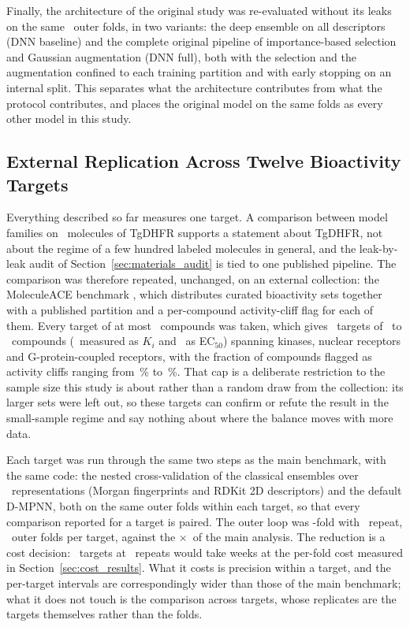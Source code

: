 Finally, the architecture of the original study was re-evaluated without its leaks on the same \TotalOuterFolds\ outer
folds, in two variants: the deep ensemble on all descriptors (DNN baseline) and the complete original pipeline of
importance-based selection and Gaussian augmentation (DNN full), both with the selection and the augmentation confined
to each training partition and with early stopping on an internal split. This separates what the architecture
contributes from what the protocol contributes, and places the original model on the same folds as every other model
in this study.


\subsection{External Replication Across Twelve Bioactivity Targets}
\label{sec:materials_generalization}

Everything described so far measures one target. A comparison between model families on \NCompounds\ molecules of
TgDHFR supports a statement about TgDHFR, not about the regime of a few hundred labeled molecules in general, and the
leak-by-leak audit of Section~\ref{sec:materials_audit} is tied to one published pipeline. The comparison was
therefore repeated, unchanged, on an external collection: the MoleculeACE benchmark \citep{vantilborg2022}, which
distributes curated bioactivity sets together with a published partition and a per-compound activity-cliff flag for
each of them. Every target of at most \GenMaxCompounds\ compounds was taken, which gives \GenNTargets\ targets of
\GenNMin\ to \GenNMax\ compounds (\GenNKi\ measured as $K_i$ and \GenNEC\ as EC$_{50}$) spanning kinases, nuclear
receptors and G-protein-coupled receptors, with the fraction of compounds flagged as activity cliffs ranging from
\GenCliffPctMin\,\% to \GenCliffPctMax\,\%. That cap is a deliberate restriction to the sample size this study is
about rather than a random draw from the collection: its larger sets were left out, so these targets can confirm or
refute the result in the small-sample regime and say nothing about where the balance moves with more data.

Each target was run through the same two steps as the main benchmark, with the same code: the nested cross-validation
of the classical ensembles over \GenNRepresentations\ representations (Morgan fingerprints and RDKit 2D descriptors)
and the default D-MPNN, both on the same outer folds within each target, so that every comparison reported for a
target is paired. The outer loop was \GenOuterKFolds-fold with \GenOuterRepeats\ repeat, \GenTotalOuterFolds\ outer
folds per target, against the \OuterRepeats$\times$\OuterKFolds\ of the main analysis. The reduction is a cost
decision: \GenNTargets\ targets at \OuterRepeats\ repeats would take weeks at the per-fold cost measured in
Section~\ref{sec:cost_results}. What it costs is precision within a target, and the per-target intervals are
correspondingly wider than those of the main benchmark; what it does not touch is the comparison across targets,
whose replicates are the targets themselves rather than the folds.

